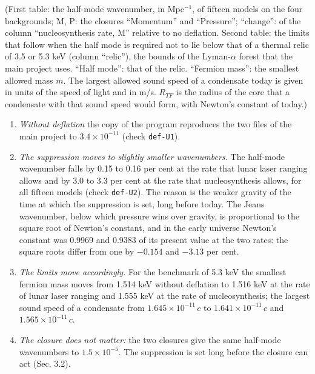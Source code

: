 \documentclass[
  10pt,
]{article}
\providecommand{\tightlist}{%
  \setlength{\itemsep}{0pt}\setlength{\parskip}{0pt}}
\begin{document}
(First table: the half-mode wavenumber, in Mpc\(^{-1}\), of fifteen
models on the four backgrounds; M, P: the closures ``Momentum'' and
``Pressure''; ``change'': of the column ``nucleosynthesis rate, M''
relative to no deflation. Second table: the limits that follow when the
half mode is required not to lie below that of a thermal relic of 3.5 or
5.3 keV (column ``relic''), the bounds of the Lyman-\(\alpha\) forest
that the main project uses. ``Half mode'': that of the relic. ``Fermion
mass'': the smallest allowed mass \(m\). The largest allowed sound speed
of a condensate today is given in units of the speed of light and in
m/s. \(R_{TF}\) is the radius of the core that a condensate with that
sound speed would form, with Newton's constant of today.)

\begin{enumerate}
\def\labelenumi{\arabic{enumi}.}
\tightlist
\item
  \emph{Without deflation} the copy of the program reproduces the two
  files of the main project to \(3.4\times10^{-11}\) (check
  \texttt{def-U1}).
\item
  \emph{The suppression moves to slightly smaller wavenumbers.} The
  half-mode wavenumber falls by 0.15 to 0.16 per cent at the rate that
  lunar laser ranging allows and by 3.0 to 3.3 per cent at the rate that
  nucleosynthesis allows, for all fifteen models (check
  \texttt{def-U2}). The reason is the weaker gravity of the time at
  which the suppression is set, long before today. The Jeans wavenumber,
  below which pressure wins over gravity, is proportional to the square
  root of Newton's constant, and in the early universe Newton's constant
  was 0.9969 and 0.9383 of its present value at the two rates: the
  square roots differ from one by \(-0.154\) and \(-3.13\) per cent.
\item
  \emph{The limits move accordingly.} For the benchmark of 5.3 keV the
  smallest fermion mass moves from 1.514 keV without deflation to 1.516
  keV at the rate of lunar laser ranging and 1.555 keV at the rate of
  nucleosynthesis; the largest sound speed of a condensate from
  \(1.645\times10^{-11}\,c\) to \(1.641\times10^{-11}\,c\) and
  \(1.565\times10^{-11}\,c\).
\item
  \emph{The closure does not matter:} the two closures give the same
  half-mode wavenumbers to \(1.5\times10^{-5}\). The suppression is set
  long before the closure can act (Sec. 3.2).
\end{enumerate}
\end{document}
